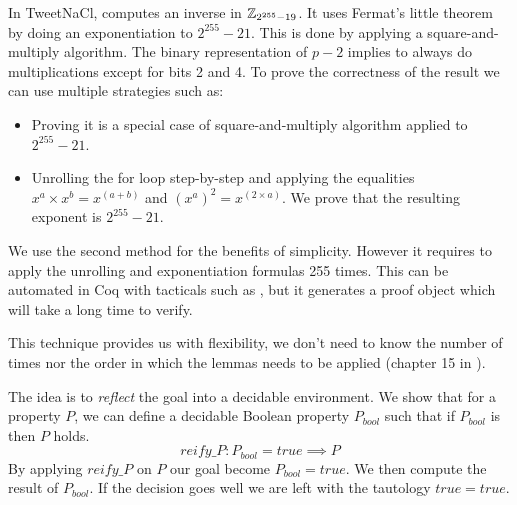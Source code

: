 In TweetNaCl,  computes an inverse in $\mathbb{Z}_{2^{255}-19}$.
It uses Fermat's little theorem by doing an exponentiation to $2^{255}-21$.
This is done by applying a square-and-multiply algorithm. The binary representation
of $p-2$ implies to always do multiplications except for bits 2 and 4.
To prove the correctness of the result we can use multiple strategies such as:
\begin{itemize}
  \item Proving it is a special case of square-and-multiply algorithm applied to $2^{255}-21$.
  \item Unrolling the for loop step-by-step and applying the equalities
  $x^a \times x^b = x^{(a+b)}$ and $(x^a)^2 = x^{(2 \times a)}$. We prove that
  the resulting exponent is $2^{255}-21$.
\end{itemize}
We use the second method for the benefits of simplicity. However it requires to
apply the unrolling and exponentiation formulas 255 times. This can be automated
in Coq with tacticals such as , but it generates a proof object which
will take a long time to verify.


 This technique provides us with
flexibility, \eg we don't need to know the number of times nor the order
in which the lemmas needs to be applied (chapter 15 in \cite{CpdtJFR}).

The idea is to \textit{reflect} the goal into a decidable environment.
We show that for a property $P$, we can define a decidable Boolean property
$P_{bool}$ such that if $P_{bool}$ is  then $P$ holds.
$$reify\_P : P_{bool} = true \implies P$$
By applying $reify\_P$ on $P$ our goal become $P_{bool} = true$.
We then compute the result of $P_{bool}$. If the decision goes well we are
left with the tautology $true = true$.

